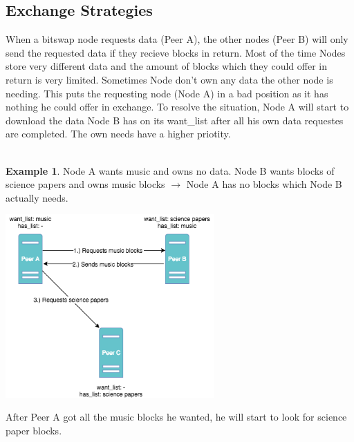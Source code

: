 \documentclass[a4paper,11pt, oneside]{report}
\theoremstyle{definition}
\newtheorem{exmp}{Example}[subsection]
\begin{document}

\subsection{Exchange Strategies}
When a bitswap node requests data (Peer A), the other nodes (Peer B) will only send the requested data if they recieve blocks in return. Most of the time Nodes store very different data and the amount of blocks which they could offer in return is very limited. Sometimes Node don't own any data the other node is needing. This puts the requesting node (Node A) in a bad position as it has nothing he could offer in exchange. To resolve the situation, Node A will start to download the data Node B has on its want\_list  after all his own data requestes are completed.  The own needs have a higher priotity.\\ \\

\newpage
\begin{exmp}
Node A wants music and owns no data. Node B wants blocks of science papers and owns music blocks $\rightarrow$ Node A has no blocks which Node B actually needs.
\begin{center}
\includegraphics[width=0.6\textwidth]{img/ipfs_bitswap_noblocks.png}\\[0.3cm] 
\end{center}
After Peer A got all the music blocks he wanted, he will start to look for science paper blocks.
\end{exmp}
\end{document}

